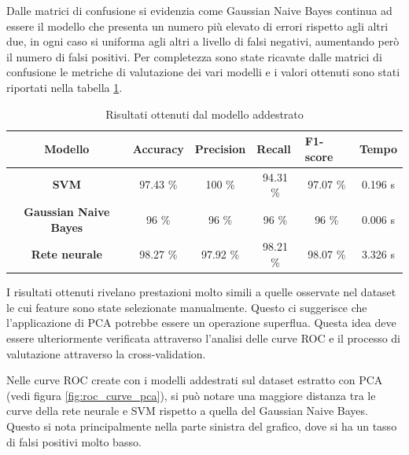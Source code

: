 Dalle matrici di confusione si evidenzia come Gaussian Naive Bayes continua ad
essere il modello che presenta un numero più elevato di errori rispetto agli
altri due, in ogni caso si uniforma agli altri a livello di falsi negativi,
aumentando però il numero di falsi positivi. Per completezza sono state ricavate
dalle matrici di confusione le metriche di valutazione dei vari modelli e i
valori ottenuti sono stati riportati nella tabella \ref{tab:risultati_pca}.
\begin{table}[!ht]
    \centering
    \begin{tabular}{@{}clllll@{}}
        \toprule
        \rowcolor[HTML]{EFEFEF}
        \textbf{Modello}                                      & \textbf{Accuracy}            & \textbf{Precision}           & \textbf{Recall}              & \textbf{F1-score}            & \textbf{Tempo}              \\ \midrule
        \cellcolor[HTML]{EFEFEF}\textbf{SVM}                  & \multicolumn{1}{c}{97.43 \%} & \multicolumn{1}{c}{100 \%}   & \multicolumn{1}{c}{94.31 \%} & \multicolumn{1}{c}{97.07 \%} & \multicolumn{1}{c}{0.196 s} \\
        \cellcolor[HTML]{EFEFEF}\textbf{Gaussian Naive Bayes} & \multicolumn{1}{c}{96 \%}    & \multicolumn{1}{c}{96 \%}    & \multicolumn{1}{c}{96 \%}    & \multicolumn{1}{c}{96 \%}    & \multicolumn{1}{c}{0.006 s} \\
        \cellcolor[HTML]{EFEFEF}\textbf{Rete neurale}         & \multicolumn{1}{c}{98.27 \%} & \multicolumn{1}{c}{97.92 \%} & \multicolumn{1}{c}{98.21 \%} & \multicolumn{1}{c}{98.07 \%} & \multicolumn{1}{c}{3.326 s} \\ \bottomrule
    \end{tabular}
    \caption{Risultati ottenuti dal modello addestrato}
    \label{tab:risultati_pca}
\end{table}

I risultati ottenuti rivelano prestazioni molto simili a quelle osservate nel
dataset le cui feature sono state selezionate manualmente. Questo ci suggerisce
che l'applicazione di PCA potrebbe essere un operazione superflua. Questa idea
deve essere ulteriormente verificata attraverso l'analisi delle curve ROC e
il processo di valutazione attraverso la cross-validation.

Nelle curve ROC create con i modelli addestrati sul dataset estratto con PCA (vedi figura \ref{fig:roc_curve_pca}), si
può notare una maggiore distanza tra le curve della rete neurale e SVM rispetto
a quella del Gaussian Naive Bayes. Questo si nota principalmente nella parte
sinistra del grafico, dove si ha un tasso di falsi positivi molto basso.

